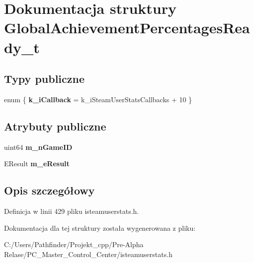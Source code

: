 \hypertarget{struct_global_achievement_percentages_ready__t}{}\section{Dokumentacja struktury Global\+Achievement\+Percentages\+Ready\+\_\+t}
\label{struct_global_achievement_percentages_ready__t}
\subsection*{Typy publiczne}
\begin{DoxyCompactItemize}
\item 
\mbox{\label{struct_global_achievement_percentages_ready__t_a42706d811b44cbf04f3ceb334eb5137f}} 
enum \{ {\bfseries k\+\_\+i\+Callback} = k\+\_\+i\+Steam\+User\+Stats\+Callbacks + 10
 \}
\end{DoxyCompactItemize}
\subsection*{Atrybuty publiczne}
\begin{DoxyCompactItemize}
\item 
\mbox{\label{struct_global_achievement_percentages_ready__t_a22d8e858e29056ad5ca8ee0882f05a24}} 
uint64 {\bfseries m\+\_\+n\+Game\+ID}
\item 
\mbox{\label{struct_global_achievement_percentages_ready__t_ad99008f7a0850b4dedd0867d497b8969}} 
E\+Result {\bfseries m\+\_\+e\+Result}
\end{DoxyCompactItemize}


\subsection{Opis szczegółowy}


Definicja w linii 429 pliku isteamuserstats.\+h.



Dokumentacja dla tej struktury została wygenerowana z pliku\+:\begin{DoxyCompactItemize}
\item 
C\+:/\+Users/\+Pathfinder/\+Projekt\+\_\+cpp/\+Pre-\/\+Alpha Relase/\+P\+C\+\_\+\+Master\+\_\+\+Control\+\_\+\+Center/isteamuserstats.\+h\end{DoxyCompactItemize}
